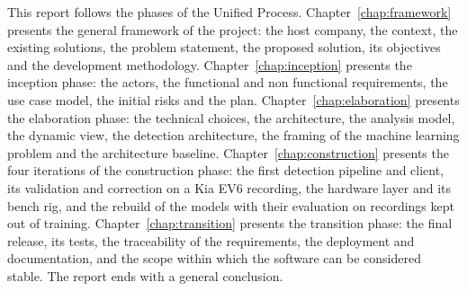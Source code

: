 This report follows the phases of the Unified Process. Chapter~\ref{chap:framework} presents the general framework of the project: the host company, the context, the existing solutions, the problem statement, the proposed solution, its objectives and the development methodology. Chapter~\ref{chap:inception} presents the inception phase: the actors, the functional and non functional requirements, the use case model, the initial risks and the plan. Chapter~\ref{chap:elaboration} presents the elaboration phase: the technical choices, the architecture, the analysis model, the dynamic view, the detection architecture, the framing of the machine learning problem and the architecture baseline. Chapter~\ref{chap:construction} presents the four iterations of the construction phase: the first detection pipeline and client, its validation and correction on a Kia EV6 recording, the hardware layer and its bench rig, and the rebuild of the models with their evaluation on recordings kept out of training. Chapter~\ref{chap:transition} presents the transition phase: the final release, its tests, the traceability of the requirements, the deployment and documentation, and the scope within which the software can be considered stable. The report ends with a general conclusion.

\cleardoublepage
